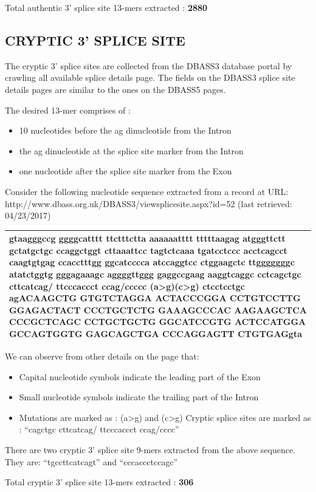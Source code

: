 \documentclass[12pt,a4paper]{article}
\begin{document}
	Total authentic 3’ splice site 13-mers extracted : \textbf{2880}
	\subsection{CRYPTIC 3' SPLICE SITE}
	The cryptic 3’ splice sites are collected from the DBASS3 database portal \cite{dbass-0,dbass-1,dbass-2} by crawling all available splice details page. The fields on the DBASS3 splice site details pages are similar to the ones on the DBASS5 pages. \par 
	The desired 13-mer comprises of : 
	\begin{itemize}
		\item 10 nucleotides before the ag dinucleotide from the Intron
		\item the ag dinucleotide at the splice site marker from the Intron
		\item one nucleotide after the splice site marker from the Exon
	\end{itemize}
	Consider the following nucleotide sequence extracted from a record at URL: http://www.dbass.org.uk/DBASS3/viewsplicesite.aspx?id=52 (last retrieved: 04/23/2017)\par
	\vspace{5mm}	
	\begin{tabular}{ | p{\linewidth} |}
		\hline
		gtaagggccg ggggcatttt ttctttctta aaaaaatttt tttttaagag atgggttctt gctatgctgc ccaggctggt cttaaattcc tagtctcaaa tgatcctccc acctcagcct caagtgtgag ccacctttgg ggcatcccca atccaggtcc ctggaagctc ttgggggggc atatctggtg gggagaaagc aggggttggg gaggccgaag aaggtcaggc cctcagctgc cttcatca\textbf{g/ t}tcccaccct cca\textbf{g/c}cccc \textbf{(a>g)}\textbf{(c>g)} ctcctcctgc agACAAGCTG GTGTCTAGGA ACTACCCGGA CCTGTCCTTG GGAGACTACT CCCTGCTCTG GAAAGCCCAC AAGAAGCTCA CCCGCTCAGC CCTGCTGCTG GGCATCCGTG ACTCCATGGA GCCAGTGGTG GAGCAGCTGA CCCAGGAGTT CTGTGAGgta \\
		\hline
	\end{tabular}
	\vspace{5mm} \break
	We can observe from other details on the page that:
	\begin{itemize}
	\item Capital nucleotide symbols indicate the leading part of the Exon
	\item Small nucleotide symbols indicate the trailing part of the Intron
	\item Mutations are marked as : (a>g) and (c>g)
	Cryptic splice sites are marked as : “cagctgc cttcatcag/ ttcccaccct ccag/cccc”
	\end{itemize}
	There are two cryptic 3’ splice site 9-mers extracted from the above sequence. They are: “tgccttcatcagt” and “cccaccctccagc” \par
	Total cryptic 3’ splice site 13-mers extracted : \textbf{306}
\end{document}
